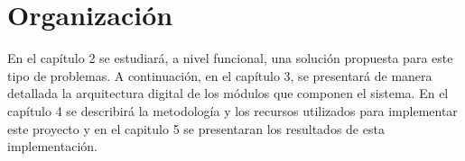\section{Organización}

En el capítulo 2 se estudiará, a nivel funcional, una solución propuesta para este tipo de problemas. A continuación, en el capítulo 3, se presentará de manera detallada la arquitectura digital de los módulos que componen el sistema. En el capítulo 4 se describirá la metodología y los recursos utilizados para implementar este proyecto y en el capitulo 5 se presentaran los resultados de esta implementación.






